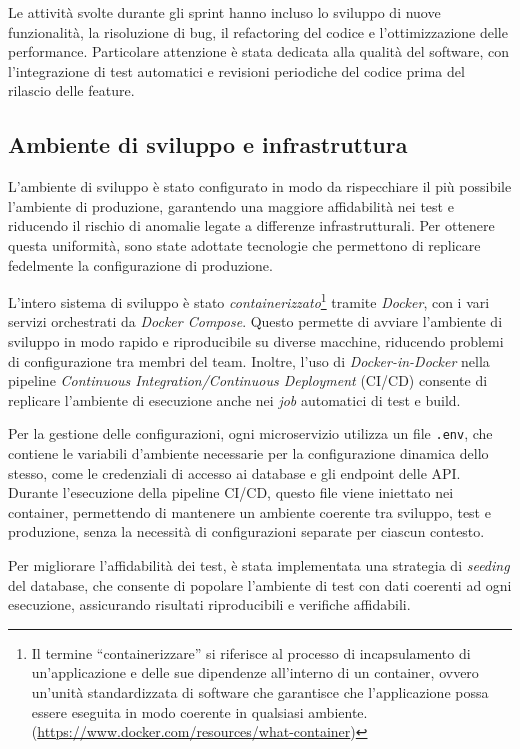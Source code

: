 Le attività svolte durante gli sprint hanno incluso lo sviluppo di nuove funzionalità, la risoluzione di bug, il refactoring del codice e l'ottimizzazione delle performance. Particolare attenzione è stata dedicata alla qualità del software, con l'integrazione di test automatici e revisioni periodiche del codice prima del rilascio delle feature.

\subsection{Ambiente di sviluppo e infrastruttura}
L'ambiente di sviluppo è stato configurato in modo da rispecchiare il più possibile l'ambiente di produzione, garantendo una maggiore affidabilità nei test e riducendo il rischio di anomalie legate a differenze infrastrutturali. Per ottenere questa uniformità, sono state adottate tecnologie che permettono di replicare fedelmente la configurazione di produzione.

L'intero sistema di sviluppo è stato \textit{containerizzato}\footnote{Il termine ``containerizzare'' si riferisce al processo di incapsulamento di un'applicazione e delle sue dipendenze all'interno di un container, ovvero un'unità standardizzata di software che garantisce che l'applicazione possa essere eseguita in modo coerente in qualsiasi ambiente. (\url{https://www.docker.com/resources/what-container})} tramite \textit{Docker}, con i vari servizi orchestrati da \textit{Docker Compose}. Questo permette di avviare l’ambiente di sviluppo in modo rapido e riproducibile su diverse macchine, riducendo problemi di configurazione tra membri del team. Inoltre, l'uso di \textit{Docker-in-Docker} nella pipeline \textit{Continuous Integration/Continuous Deployment} (CI/CD) consente di replicare l’ambiente di esecuzione anche nei \textit{job} automatici di test e build.

Per la gestione delle configurazioni, ogni microservizio utilizza un file \texttt{.env}, che contiene le variabili d’ambiente necessarie per la configurazione dinamica dello stesso, come le credenziali di accesso ai database e gli endpoint delle API. Durante l’esecuzione della pipeline CI/CD, questo file viene iniettato nei container, permettendo di mantenere un ambiente coerente tra sviluppo, test e produzione, senza la necessità di configurazioni separate per ciascun contesto.

Per migliorare l'affidabilità dei test, è stata implementata una strategia di \textit{seeding} del database, che consente di popolare l’ambiente di test con dati coerenti ad ogni esecuzione, assicurando risultati riproducibili e verifiche affidabili.

